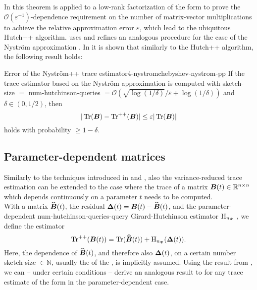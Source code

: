 In \cite{meyer2021hutch} this theorem is applied to a low-rank factorization of
the form  to prove the $\mathcal{O}(\varepsilon^{-1})$-dependence
requirement on the number of matrix-vector multiplications to achieve the relative
approximation error $\varepsilon$, which lead to the ubiquitous Hutch++ algorithm.
\cite{lin2017randomized} uses and \cite{persson2022hutch} refines an analogous procedure for the
case of the Nystr\"om approximation . In \cite[theorem~3.4]{persson2022hutch}
it is shown that similarly to the Hutch++ algorithm, the following result holds:
\begin{theorem}{Error of the Nystr\"om++ trace estimator}{4-nystromchebyshev-nystrom-pp}
    If the trace estimator  based
    on the Nystr\"om approximation  is computed
    with \gls{sketch-size} $=$ \gls{num-hutchinson-queries} $= \mathcal{O}(\sqrt{\log(1/\delta)}/\varepsilon + \log(1/\delta))$
    and $\delta \in (0, 1/2)$, then
    \begin{equation}
        |\operatorname{Tr}(\boldsymbol{B}) - \operatorname{Tr}^{++}(\boldsymbol{B})| \leq \varepsilon |\operatorname{Tr}(\boldsymbol{B})|
    \end{equation}
    holds with probability $\geq 1-\delta$.
\end{theorem}


\subsection{Parameter-dependent matrices}
\label{subsec:4-nystromchebyshev-reduction-parametrized-matrices}

Similarly to the techniques introduced in  and ,
also the variance-reduced trace estimation can be extended to the case where
the trace of a matrix $\boldsymbol{B}(t) \in \mathbb{R}^{n \times n}$ which depends continuously on a parameter $t$
needs to be computed.\\

With a matrix $\widehat{\boldsymbol{B}}(t)$, the residual $\boldsymbol{\Delta}(t) = \boldsymbol{B}(t) - \widehat{\boldsymbol{B}}(t)$,
and the parameter-dependent \gls{num-hutchinson-queries}-query Girard-Hutchinson estimator $\operatorname{H}_{n_{\Psi}}$
, we define the estimator 
\begin{equation}
    \operatorname{Tr}^{++}(\boldsymbol{B}(t)) = \operatorname{Tr}(\widehat{\boldsymbol{B}}(t)) + \operatorname{H}_{n_{\Psi}}(\boldsymbol{\Delta}(t)).
    \label{equ:4-nystromchebyshev-parameter-hutch-pp}
\end{equation}
Here, the dependence of $\widehat{\boldsymbol{B}}(t)$, and therefore also $\boldsymbol{\Delta}(t)$,
on a certain number \gls{sketch-size} $\in \mathbb{N}$, usually the 
of the , is implicitly assumed.
Using the result from ,
we can -- under certain conditions -- derive an analogous result
to  for any trace estimate of the form
 in the parameter-dependent case.

